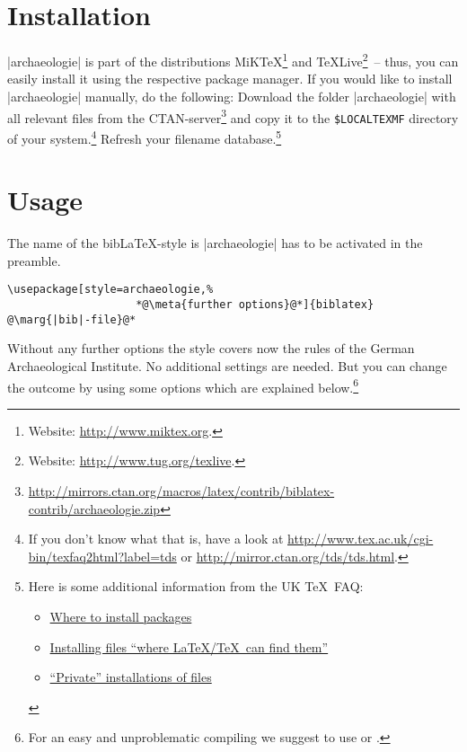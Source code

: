\documentclass[a4paper,
10pt,
greek,
french,
spanish,
italian,
ngerman,
english
]{ltxdoc}
\begin{document}
\section{Installation}
|archaeologie| is part of the distributions MiK\TeX \footnote{Website: \url{http://www.miktex.org}.} 
and \TeX Live\footnote{Website: \url{http://www.tug.org/texlive}.}~-- thus, you
can easily install it using the respective package manager. 
If you would like to
install |archaeologie| manually, do the following:
Download the folder |archaeologie| with all relevant files from the CTAN-server\footnote{\url{http://mirrors.ctan.org/macros/latex/contrib/biblatex-contrib/archaeologie.zip}} and copy it to the \texttt{\$LOCALTEXMF} directory of
 your system.\footnote{If you don't know what that is, have a look at
\url{http://www.tex.ac.uk/cgi-bin/texfaq2html?label=tds} or 
\url{http://mirror.ctan.org/tds/tds.html}.} 
Refresh your filename database.\footnote{ 
Here is some additional information from the UK \TeX\ FAQ:
\begin{itemize}[nosep,after=\vspace{-\baselineskip} ]
	\item \href{%
    http://www.tex.ac.uk/cgi-bin/texfaq2html?label=install-where}{%
    Where to install packages}
	\item \href{%
	  http://www.tex.ac.uk/cgi-bin/texfaq2html?label=inst-wlcf}{%
	  Installing files \enquote{where \LaTeX /TeX\ can find them}}
	\item \href{%
	  http://www.tex.ac.uk/cgi-bin/texfaq2html?label=privinst}{%
	  \enquote{Private} installations of files}
\end{itemize}
}

\section{Usage}
   The name of the bib\LaTeX-style is  |archaeologie| has to be activated in the preamble. 

\begin{lstlisting}
\usepackage[style=archaeologie,%
					*@\meta{further options}@*]{biblatex}
@\marg{|bib|-file}@*
\end{lstlisting}

Without any further options the style covers now the rules of the German Archaeological Institute. No additional settings are needed.
But you can change the outcome by using some options which are explained below.\footnote{For an easy and unproblematic compiling we suggest to use  or  .}
\end{document}
